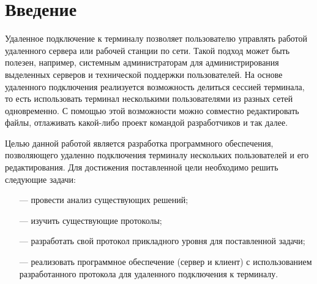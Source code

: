 \chapter*{Введение}

Удаленное подключение к терминалу позволяет пользователю управлять работой удаленного сервера или рабочей станции по сети. Такой подход может быть полезен, например, системным администраторам для администрирования выделенных серверов и технической поддержки пользователей. На основе удаленного подключения реализуется возможность делиться сессией терминала, то есть использовать терминал несколькими пользователями из разных сетей одновременно. С помощью этой возможности можно совместно редактировать файлы, отлаживать какой-либо проект командой разработчиков и так далее.

Целью данной работой является разработка программного обеспечения, позволяющего удаленно подключения терминалу нескольких пользователей и его редактирования. Для достижения поставленной цели необходимо решить следующие задачи:

\begin{itemize}
	\item[---] провести анализ существующих решений;
	\item[---] изучить существующие протоколы;
	\item[---] разработать свой протокол прикладного уровня для поставленной задачи;
	\item[---] реализовать программное обеспечение (сервер и клиент) с использованием разработанного протокола для удаленного подключения к терминалу.
\end{itemize}
